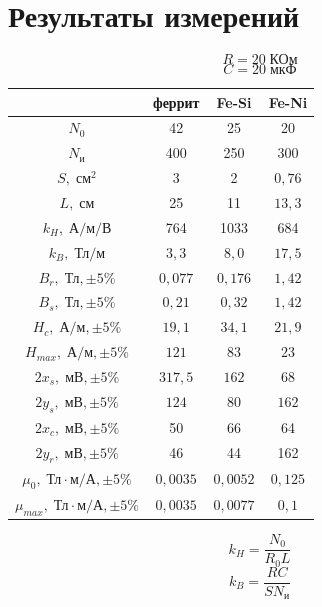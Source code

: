 \section{Результаты измерений}
\[
    R = 20\;\text{КОм}
\]
\[
    C = 20\;\text{мкФ}
\]

\begin{tabular}{|c|c|c|c|}
\hline
     & феррит & Fe-Si & Fe-Ni \\\hline
    $N_{0}$ & 42 & 25 & 20 \\\hline
    $N_{\text{и}}$ & 400 & 250 & 300 \\\hline
    $S,\;\text{см}^{2}$ & 3 & 2 & $0{,}76$ \\\hline
    $L,\;\text{см}$ & 25 & 11 & $13{,}3$ \\\hline
    $k_{H},\;\text{А}/\text{м}/\text{В}$ & 764 & 1033 & 684 \\\hline
    $k_{B}, \;\text{Тл}/\text{м}$ & $3{,}3$ & $8{,}0$ & $17{,}5$ \\\hline
    $B_{r},\;\text{Тл}, \pm 5\%$ & $0{,}077$ & $0{,}176$ & $1{,}42$ \\\hline
    $B_{s},\;\text{Тл},\pm 5 \%$ & $0{,}21$ & $0{,}32$ & $1{,}42$ \\\hline
    $H_{c},\;\text{А}/\text{м},\pm 5 \%$ & $19{,}1$ & $34{,}1$ & $21{,}9$ \\\hline
    $H_{max},\;\text{А}/\text{м},\pm 5 \%$ & $121$ & $83$ & $23$ \\\hline
    $2x_{s},\;\text{мВ}, \pm 5\%$ & $317{,}5$ & $162$ & $68$ \\\hline
    $2y_{s},\;\text{мВ}, \pm 5\%$ & $124$ & $80$ & $162$ \\\hline
    $2x_{c},\;\text{мВ},\pm 5\%$ & 50 & 66 & 64 \\\hline
    $2y_{r},\;\text{мВ},\pm 5\%$ & 46 & 44 & 162 \\\hline
    $\mu_{0},\;\text{Тл} \cdot \text{м}/\text{А},\pm 5\%$ & $0{,}0035$ & $0{,}0052$ & $0{,}125$ \\\hline
    $\mu_{max},\;\text{Тл} \cdot \text{м}/\text{А},\pm 5\%$ & $0{,}0035$ & $0{,}0077$ & $0{,}1$ \\\hline
\end{tabular}
\[
    k_{H} = \frac{N_{0}}{R_{0}L}
\]
\[
    k_{B} = \frac{RC}{SN_{\text{и}}}
\]

